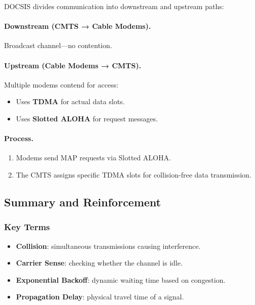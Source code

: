 \documentclass[12pt]{article}
\begin{document}
DOCSIS divides communication into downstream and upstream paths:

\paragraph{Downstream (CMTS → Cable Modems).}
Broadcast channel—no contention.

\paragraph{Upstream (Cable Modems → CMTS).}
Multiple modems contend for access:
\begin{itemize}
    \item Uses \textbf{TDMA} for actual data slots.
    \item Uses \textbf{Slotted ALOHA} for request messages.
\end{itemize}

\paragraph{Process.}
\begin{enumerate}
    \item Modems send MAP requests via Slotted ALOHA.
    \item The CMTS assigns specific TDMA slots for collision-free data transmission.
\end{enumerate}

\subsection{Summary and Reinforcement}

\subsubsection{Key Terms}

\begin{itemize}
    \item \textbf{Collision}: simultaneous transmissions causing interference.
    \item \textbf{Carrier Sense}: checking whether the channel is idle.
    \item \textbf{Exponential Backoff}: dynamic waiting time based on congestion.
    \item \textbf{Propagation Delay}: physical travel time of a signal.
\end{itemize}
\end{document}
